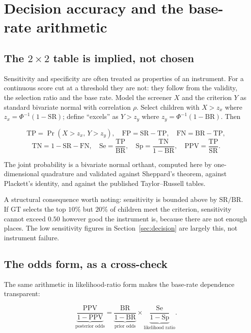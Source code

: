 \section{Decision accuracy and the base-rate arithmetic}
\label{app:base}

\subsection{The $2\times2$ table is implied, not chosen}

Sensitivity and specificity are often treated as properties of an instrument.
For a continuous score cut at a threshold they are not: they follow from the
validity, the selection ratio and the base rate. Model the screener $X$ and the
criterion $Y$ as standard bivariate normal with correlation $\rho$. Select
children with $X>z_x$ where $z_x=\Phi^{-1}(1-\mathrm{SR})$; define ``excels'' as
$Y>z_y$ where $z_y=\Phi^{-1}(1-\mathrm{BR})$. Then

\[
\mathrm{TP}=\Pr(X>z_x,\,Y>z_y),\quad
\mathrm{FP}=\mathrm{SR}-\mathrm{TP},\quad
\mathrm{FN}=\mathrm{BR}-\mathrm{TP},
\]
\[
\mathrm{TN}=1-\mathrm{SR}-\mathrm{FN},\quad
\text{Se}=\frac{\mathrm{TP}}{\mathrm{BR}},\quad
\text{Sp}=\frac{\mathrm{TN}}{1-\mathrm{BR}},\quad
\text{PPV}=\frac{\mathrm{TP}}{\mathrm{SR}} .
\]

The joint probability is a bivariate normal orthant, computed here by
one-dimensional quadrature and validated against Sheppard's theorem, against
Plackett's identity, and against the published Taylor--Russell tables.

A structural consequence worth noting: sensitivity is bounded above by
$\mathrm{SR}/\mathrm{BR}$. If GT selects the top $10\%$ but $20\%$ of children
meet the criterion, sensitivity cannot exceed $0.50$ however good the instrument
is, because there are not enough places. The low sensitivity figures in
Section~\ref{sec:decision} are largely this, not instrument failure.

\subsection{The odds form, as a cross-check}

The same arithmetic in likelihood-ratio form makes the base-rate dependence
transparent:

\[
\underbrace{\frac{\text{PPV}}{1-\text{PPV}}}_{\text{posterior odds}}
=\underbrace{\frac{\mathrm{BR}}{1-\mathrm{BR}}}_{\text{prior odds}}
\times
\underbrace{\frac{\text{Se}}{1-\text{Sp}}}_{\text{likelihood ratio}} .
\]

